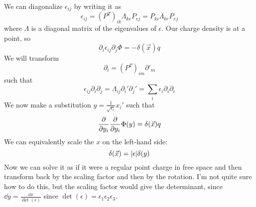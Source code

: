 \documentclass[a4paper,twoside]{article}
\begin{document}
\begin{tcolorbox}[breakable]
    We can diagonalize $ \epsilon_{ij} $ by writing it as
    \begin{equation}
        \epsilon_{ij} = (P^T)_{ik}\Lambda_{ke}P_{ej} = P_{ki}\Lambda_{ke}P_{ej}
    \end{equation}
    where $ \Lambda $ is a diagonal matrix of the eigenvalues of $ \epsilon $. Our charge density is at a point, so
    \begin{equation}
        \partial_i \epsilon_{ij} \partial_j \Phi = -\delta(\vec{x})q
    \end{equation}
    We will transform
    \begin{equation}
        \partial_i = (P^T)_{im}\partial'_m
    \end{equation}
    such that
    \begin{equation}
        \epsilon_{ij}\partial_i\partial_j = \Lambda_{ij}\partial_i'\partial_j' = \sum_i\epsilon_i\partial_i\partial_i
    \end{equation}
    We now make a substitution $ y = \frac{1}{\sqrt{\epsilon_i}} x_i' $ such that
    \begin{equation}
        \pdv{y_i} \pdv{y_i}\Phi(y) = \delta(\vec{x})q
    \end{equation}
    We can equivalently scale the $ x $ on the left-hand side:
    \begin{equation}
        \delta(\vec{x}) = \abs{\epsilon} \delta(y)
    \end{equation}
    Now we can solve it as if it were a regular point charge in free space and then transform back by the scaling factor and then by the rotation. I'm not quite sure how to do this, but the scaling factor would give the determinant, since $ \dd{y} = \frac{\dd{x}}{\det(\epsilon)} $ since $ \det(\epsilon) = \epsilon_1\epsilon_2\epsilon_3 $.
\end{tcolorbox}
\end{document}
